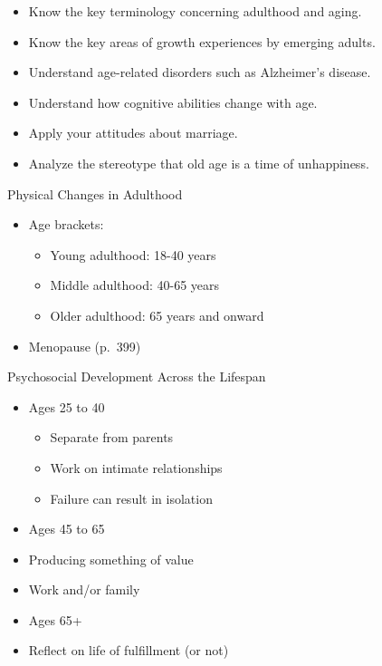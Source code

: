 \documentclass[
]{book}
\providecommand{\tightlist}{%
  \setlength{\itemsep}{0pt}\setlength{\parskip}{0pt}}
\begin{document}
\begin{reflect}
\begin{itemize}
\tightlist
\item
  Know the key terminology concerning adulthood and aging.\\
\item
  Know the key areas of growth experiences by emerging adults.\\
\item
  Understand age-related disorders such as Alzheimer's disease.\\
\item
  Understand how cognitive abilities change with age.\\
\item
  Apply your attitudes about marriage.\\
\item
  Analyze the stereotype that old age is a time of unhappiness.
\end{itemize}

Physical Changes in Adulthood

\begin{itemize}
\tightlist
\item
  Age brackets:

  \begin{itemize}
  \tightlist
  \item
    Young adulthood: 18-40 years\\
  \item
    Middle adulthood: 40-65 years\\
  \item
    Older adulthood: 65 years and onward\\
  \end{itemize}
\item
  Menopause (p.~399)
\end{itemize}

Psychosocial Development Across the Lifespan

\begin{itemize}
\tightlist
\item
  Ages 25 to 40

  \begin{itemize}
  \tightlist
  \item
    Separate from parents
  \item
    Work on intimate relationships
  \item
    Failure can result in isolation
  \end{itemize}
\item
  Ages 45 to 65
\item
  Producing something of value
\item
  Work and/or family
\item
  Ages 65+
\item
  Reflect on life of fulfillment (or not)
\end{itemize}


\end{reflect}
\end{document}
